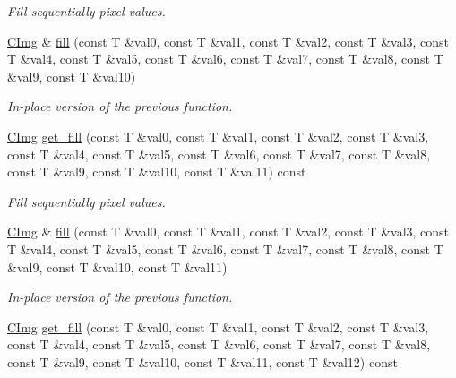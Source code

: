 \begin{DoxyCompactItemize}
\begin{DoxyCompactList}\small\item\em Fill sequentially pixel values. \end{DoxyCompactList}\item 
\hypertarget{structcimg__library_1_1_c_img_a979bf5dde9a2366168b647b12a0416a3}{\hyperlink{structcimg__library_1_1_c_img}{C\-Img} \& \hyperlink{structcimg__library_1_1_c_img_a979bf5dde9a2366168b647b12a0416a3}{fill} (const T \&val0, const T \&val1, const T \&val2, const T \&val3, const T \&val4, const T \&val5, const T \&val6, const T \&val7, const T \&val8, const T \&val9, const T \&val10)}\label{structcimg__library_1_1_c_img_a979bf5dde9a2366168b647b12a0416a3}

\begin{DoxyCompactList}\small\item\em In-\/place version of the previous function. \end{DoxyCompactList}\item 
\hypertarget{structcimg__library_1_1_c_img_a67d30666f03f457e70ba484f0b54bd3c}{\hyperlink{structcimg__library_1_1_c_img}{C\-Img} \hyperlink{structcimg__library_1_1_c_img_a67d30666f03f457e70ba484f0b54bd3c}{get\-\_\-fill} (const T \&val0, const T \&val1, const T \&val2, const T \&val3, const T \&val4, const T \&val5, const T \&val6, const T \&val7, const T \&val8, const T \&val9, const T \&val10, const T \&val11) const }\label{structcimg__library_1_1_c_img_a67d30666f03f457e70ba484f0b54bd3c}

\begin{DoxyCompactList}\small\item\em Fill sequentially pixel values. \end{DoxyCompactList}\item 
\hypertarget{structcimg__library_1_1_c_img_a25bb9c696dc72ea9fbdbf8c0ea9494b9}{\hyperlink{structcimg__library_1_1_c_img}{C\-Img} \& \hyperlink{structcimg__library_1_1_c_img_a25bb9c696dc72ea9fbdbf8c0ea9494b9}{fill} (const T \&val0, const T \&val1, const T \&val2, const T \&val3, const T \&val4, const T \&val5, const T \&val6, const T \&val7, const T \&val8, const T \&val9, const T \&val10, const T \&val11)}\label{structcimg__library_1_1_c_img_a25bb9c696dc72ea9fbdbf8c0ea9494b9}

\begin{DoxyCompactList}\small\item\em In-\/place version of the previous function. \end{DoxyCompactList}\item 
\hypertarget{structcimg__library_1_1_c_img_ae579a07c0758d158ed27821fd91dc35d}{\hyperlink{structcimg__library_1_1_c_img}{C\-Img} \hyperlink{structcimg__library_1_1_c_img_ae579a07c0758d158ed27821fd91dc35d}{get\-\_\-fill} (const T \&val0, const T \&val1, const T \&val2, const T \&val3, const T \&val4, const T \&val5, const T \&val6, const T \&val7, const T \&val8, const T \&val9, const T \&val10, const T \&val11, const T \&val12) const }\label{structcimg__library_1_1_c_img_ae579a07c0758d158ed27821fd91dc35d}


\end{DoxyCompactItemize}
